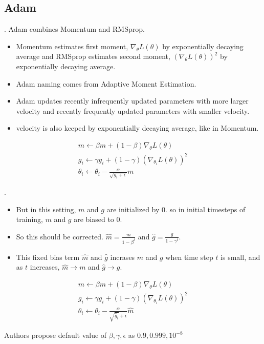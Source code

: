\documentclass[8pt]{beamer}
\begin{document}
\subsection{Adam}
\begin{frame}{.}
    Adam combines Momentum and RMSprop.
    \begin{itemize}
        \item Momentum estimates first moment, $\nabla_\theta L(\theta)$ by exponentially decaying average and RMSprop estimates second moment, $(\nabla_\theta L(\theta))^2$ by exponentially decaying average.
        \item Adam naming comes from Adaptive Moment Estimation.
        \item Adam updates recently infrequently updated parameters with more larger velocity and recently frequently updated parameters with smaller velocity.
        \item velocity is also keeped by exponentially decaying average, like in Momentum.
    \end{itemize}

    \[
    \begin{gathered}
        m \leftarrow \beta m + (1- \beta) \nabla_{\theta} L(\theta) \\
        g_i \leftarrow \gamma g_i  + (1- \gamma) (\nabla_{\theta_i} L(\theta))^2\\
        \theta_i \leftarrow \theta_i - \frac{\alpha}{\sqrt{g_i + \epsilon}} m
    \end{gathered}
    \]
\end{frame}

\begin{frame}{.}
    \begin{itemize}
        \item But in this setting, $m$ and $g$ are initialized by $0$. so in initial timesteps of training, $m$ and $g$ are biased to $0$.
        \item So this should be corrected. $\hat{m} = \frac{m}{1 - \beta^t}$ and $\hat{g} = \frac{g}{1 - \gamma^t}$.
        \item This fixed bias term $\hat{m}$ and $\hat{g}$ incrases $m$ and $g$ when time step $t$ is small, and as $t$ increases, $\hat{m} \rightarrow m$ and $\hat{g} \rightarrow g$.
    \end{itemize}

    \[
        \begin{gathered}
        m \leftarrow \beta m + (1- \beta) \nabla_{\theta} L(\theta) \\
        g_i \leftarrow \gamma g_i  + (1- \gamma) (\nabla_{\theta_i} L(\theta))^2\\
        \theta_i \leftarrow \theta_i - \frac{\alpha}{\sqrt{\hat{g}_i} + \epsilon}\hat{m}
    \end{gathered}
    \]

    Authors propose default value of $\beta, \gamma, \epsilon$ as $0.9, 0.999, 10^{-8}$
\end{frame}
\end{document}
